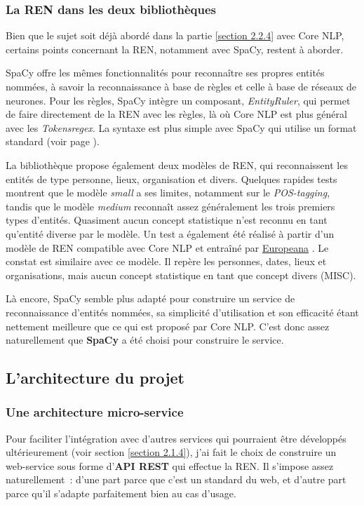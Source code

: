 \subsubsection{La REN dans les deux bibliothèques}
Bien que le sujet soit déjà abordé dans la partie \ref{section 2.2.4} avec Core NLP, certains points concernant la REN, notamment avec SpaCy, restent à aborder. 
\newline

SpaCy offre les mêmes fonctionnalités pour reconnaître ses propres entités nommées, à savoir la reconnaissance à base de règles et celle à base de réseaux de neurones. Pour les règles, SpaCy intègre un composant, \textit{EntityRuler}, qui permet de faire directement de la REN avec les règles, là où Core NLP est plus général avec les \textit{Tokensregex}. La syntaxe est plus simple avec SpaCy qui utilise un format standard (voir page \pageref{rule-exemple}).
\newline

La bibliothèque propose également deux modèles de REN, qui reconnaissent les entités de type personne, lieux, organisation et divers. Quelques rapides tests montrent que le modèle \textit{small} a ses limites, notamment sur le \textit{POS-tagging}, tandis que le modèle \textit{medium} reconnaît assez généralement les trois premiers types d'entités. Quasiment aucun concept statistique n'est reconnu en tant qu'entité diverse par le modèle. Un test a également été réalisé à partir d'un modèle de REN compatible avec Core NLP et entraîné par \href{http://lab.kbresearch.nl/static/html/eunews.html}{Europeana} \cite{europeana-ner}. Le constat est similaire avec ce modèle. Il repère les personnes, dates, lieux et organisations, mais aucun concept statistique en tant que concept divers (MISC).
\newline

Là encore, SpaCy semble plus adapté pour construire un service de reconnaissance d'entités nommées, sa simplicité d'utilisation et son efficacité étant nettement meilleure que ce qui est proposé par Core NLP. C'est donc assez naturellement que \textbf{SpaCy} a été choisi pour construire le service. 
\label{section 3.1.4}

\subsection{L'architecture du projet}

\subsubsection{Une architecture micro-service}
Pour faciliter l'intégration avec d'autres services qui pourraient être développés ultérieurement (voir section \ref{section 2.1.4}), j'ai fait le choix de construire un web-service sous forme d'\textbf{API REST} qui effectue la REN. Il s'impose assez naturellement~: d'une part parce que c'est un standard du web, et d'autre part parce qu'il s'adapte parfaitement bien au cas d'usage.
\newline

